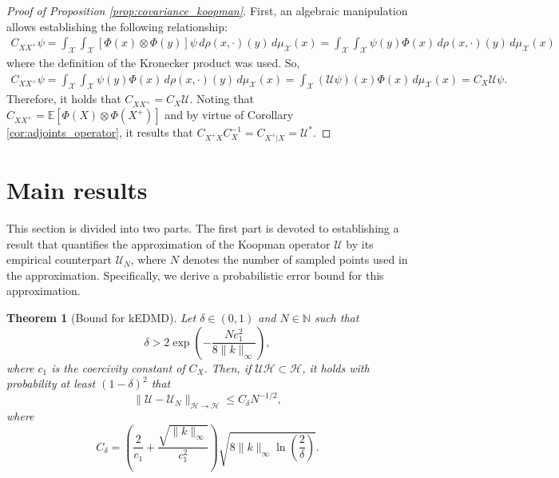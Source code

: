 \documentclass{article}
\newtheorem{theo}{Theorem}
\renewcommand{\H}{\mathcal{H}}
\newcommand{\U}{\mathcal{U}}
\newcommand{\X}{\mathcal{X}}
\begin{document}
\begin{proof}[Proof of Proposition \ref{prop:covariance_koopman}]
    First, an algebraic manipulation allows establishing the following relationship:
\begin{equation*}
    \begin{aligned}
        C_{X X^+} \psi = \int_\X \int_\X [\Phi (x) \otimes \Phi (y)] \psi \, d\rho (x, \cdot) (y) \, d\mu_\X (x) = \int_\X \int_\X \psi(y) \Phi (x) \, d\rho (x, \cdot) (y) \, d\mu_\X (x)
    \end{aligned}
\end{equation*}
where the definition of the Kronecker product was used. So,
\begin{equation*}
    \begin{aligned}
        C_{X X^+} \psi = \int_\X \int_\X \psi(y) \Phi (x) \, d\rho (x, \cdot) (y) \, d\mu_\X (x) = \int_\X (\U \psi)(x) \Phi (x) \, d\mu_\X (x) = C_X \U \psi.
    \end{aligned}
\end{equation*}
Therefore, it holds that \(C_{X X^+} = C_X \U.\) Noting that \(C_{X X^+} = \mathbb{E}[\Phi (X) \otimes \Phi (X^+)]\) and by virtue of Corollary \ref{cor:adjoints_operator}, it results that \(C_{X^+X} C_X^{-1} = C_{X^+ | X} = \U^*\).
\end{proof}

\section{Main results}
This section is divided into two parts. The first part is devoted to establishing a result that quantifies the approximation of the Koopman operator \( \mathcal{U} \) by its empirical counterpart \( \mathcal{U}_N \), where \( N \) denotes the number of sampled points used in the approximation. Specifically, we derive a probabilistic error bound for this approximation.

\begin{theo}[Bound for kEDMD]
\label{theo:error_koop_sqrt_N_def}
Let \( \delta \in (0, 1) \) and \( N \in \mathbb{N} \) such that
\[
\delta > 2 \exp \left( -\frac{N c_1^2}{8\|k\|_\infty} \right),
\]
where \( c_1 \) is the coercivity constant of \( C_X \). Then, if \( \U \H \subset \H \), it holds with probability at least \( (1 - \delta)^2 \) that
\begin{equation*}
    \| \U - \U_N \|_{\H \to \H} \leq C_\delta N^{-1/2},
\end{equation*}
where
\[
C_\delta = \left( \frac{2}{c_1} + \frac{\sqrt{\|k\|_\infty}}{c_1^2} \right)
\sqrt{8 \|k\|_\infty \ln \left( \frac{2}{\delta} \right)}.
\]
\end{theo}
\end{document}
